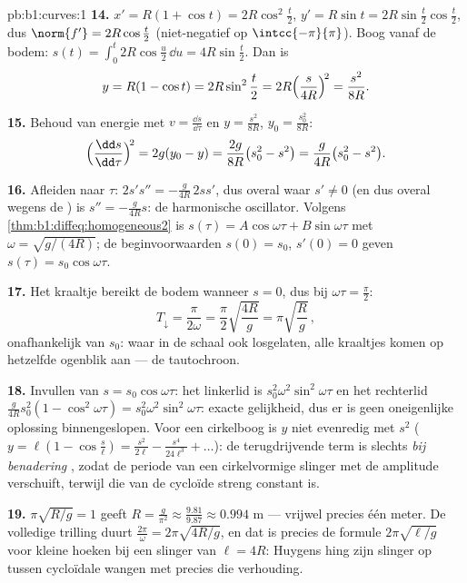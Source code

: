 \begin{solution}{pb:b1:curves:1}
\textbf{14.} $x' = R(1 + \cos t) = 2R\cos^2\frac t2$, $y' = R\sin t
= 2R\sin\frac t2\cos\frac t2$, dus $\norm{f'} = 2R\cos\frac t2$
(niet-negatief op $\intcc{-\pi}{\pi}$). Boog vanaf de bodem: $s(t)
= \int_0^t 2R\cos\frac u2\,\dd u = 4R\sin\frac t2$. Dan is
\[
y = R(1 - \cos t) = 2R\sin^2\frac t2
= 2R\Bigl(\frac{s}{4R}\Bigr)^{\!2} = \frac{s^2}{8R} .
\]

\textbf{15.} Behoud van energie met $v = \frac{\dd s}{\dd\tau}$ en
$y = \frac{s^2}{8R}$, $y_0 = \frac{s_0^2}{8R}$:
\[
\Bigl(\frac{\dd s}{\dd\tau}\Bigr)^{\!2} = 2g(y_0 - y)
= \frac{2g}{8R}\bigl(s_0^2 - s^2\bigr)
= \frac{g}{4R}\bigl(s_0^2 - s^2\bigr).
\]

\textbf{16.} Afleiden naar $\tau$: $2s's'' = -\frac{g}{4R}\,2ss'$,
dus overal waar $s' \neq 0$ (en dus overal wegens de )
is $s'' = -\frac{g}{4R}s$: de harmonische oscillator. Volgens
\cref{thm:b1:diffeq:homogeneous2} is $s(\tau) = A\cos\omega\tau +
B\sin\omega\tau$ met $\omega = \sqrt{g/(4R)}$; de beginvoorwaarden
$s(0) = s_0$, $s'(0) = 0$ geven $s(\tau) = s_0\cos\omega\tau$.

\textbf{17.} Het kraaltje bereikt de bodem wanneer $s = 0$, dus bij
$\omega\tau = \frac\pi2$:
\[
T_{\downarrow} = \frac{\pi}{2\omega}
= \frac\pi2\sqrt{\frac{4R}{g}} = \pi\sqrt{\frac Rg}\,,
\]
onafhankelijk van $s_0$: waar in de schaal ook losgelaten, alle
kraaltjes komen op hetzelfde ogenblik aan --- de tautochroon.

\textbf{18.} Invullen van $s = s_0\cos\omega\tau$: het linkerlid is
$s_0^2\omega^2\sin^2\omega\tau$ en het rechterlid
$\frac{g}{4R}s_0^2(1 - \cos^2\omega\tau) =
s_0^2\omega^2\sin^2\omega\tau$: exacte gelijkheid, dus er is geen
oneigenlijke oplossing binnengeslopen. Voor een cirkelboog is $y$
niet evenredig met $s^2$ ($y = \ell(1 - \cos\frac s\ell) =
\frac{s^2}{2\ell} - \frac{s^4}{24\ell^3} + \dots$): de
terugdrijvende term is slechts \emph{bij benadering} , zodat
de periode van een cirkelvormige slinger met de amplitude
verschuift, terwijl die van de cycloïde streng constant is.

\textbf{19.} $\pi\sqrt{R/g} = 1$ geeft $R = \frac{g}{\pi^2} \approx
\frac{9.81}{9.87} \approx 0.994$ m --- vrijwel precies één meter.
De volledige trilling duurt $\frac{2\pi}\omega = 2\pi\sqrt{4R/g}$,
en dat is precies de formule $2\pi\sqrt{\ell/g}$ voor kleine hoeken
bij een slinger van  $\ell = 4R$: Huygens hing zijn slinger
op tussen cycloïdale wangen met precies die verhouding.


\end{solution}
